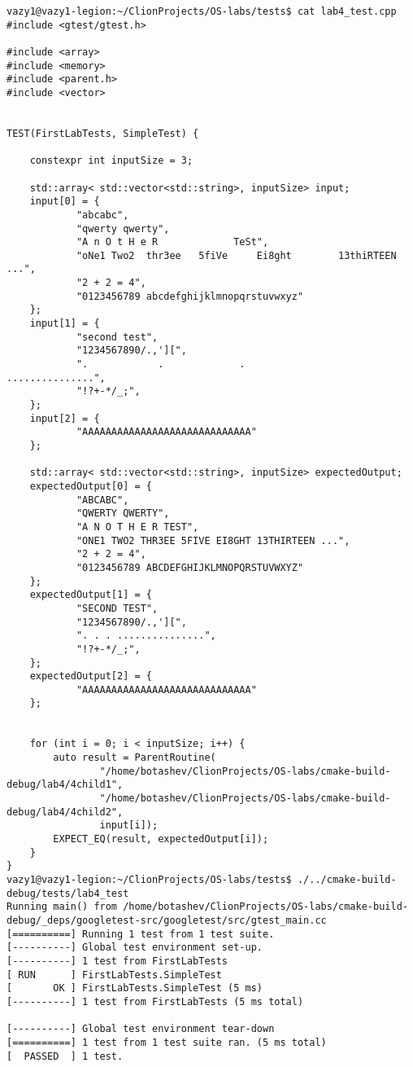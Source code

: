 \documentclass[pdf, unicode, 12pt, a4paper,oneside,fleqn]{article}
\begin{document}
\begin{verbatim}
vazy1@vazy1-legion:~/ClionProjects/OS-labs/tests$ cat lab4_test.cpp 
#include <gtest/gtest.h>

#include <array>
#include <memory>
#include <parent.h>
#include <vector>


TEST(FirstLabTests, SimpleTest) {

    constexpr int inputSize = 3;

    std::array< std::vector<std::string>, inputSize> input;
    input[0] = {
            "abcabc",
            "qwerty qwerty",
            "A n O t H e R             TeSt",
            "oNe1 Two2  thr3ee   5fiVe     Ei8ght        13thiRTEEN             ...",
            "2 + 2 = 4",
            "0123456789 abcdefghijklmnopqrstuvwxyz"
    };
    input[1] = {
            "second test",
            "1234567890/.,'][",
            ".            .             .                         ...............",
            "!?+-*/_;",
    };
    input[2] = {
            "AAAAAAAAAAAAAAAAAAAAAAAAAAAAA"
    };

    std::array< std::vector<std::string>, inputSize> expectedOutput;
    expectedOutput[0] = {
            "ABCABC",
            "QWERTY QWERTY",
            "A N O T H E R TEST",
            "ONE1 TWO2 THR3EE 5FIVE EI8GHT 13THIRTEEN ...",
            "2 + 2 = 4",
            "0123456789 ABCDEFGHIJKLMNOPQRSTUVWXYZ"
    };
    expectedOutput[1] = {
            "SECOND TEST",
            "1234567890/.,'][",
            ". . . ...............",
            "!?+-*/_;",
    };
    expectedOutput[2] = {
            "AAAAAAAAAAAAAAAAAAAAAAAAAAAAA"
    };


    for (int i = 0; i < inputSize; i++) {
        auto result = ParentRoutine(
                "/home/botashev/ClionProjects/OS-labs/cmake-build-debug/lab4/4child1",
                "/home/botashev/ClionProjects/OS-labs/cmake-build-debug/lab4/4child2",
                input[i]);
        EXPECT_EQ(result, expectedOutput[i]);
    }
}
vazy1@vazy1-legion:~/ClionProjects/OS-labs/tests$ ./../cmake-build-debug/tests/lab4_test 
Running main() from /home/botashev/ClionProjects/OS-labs/cmake-build-debug/_deps/googletest-src/googletest/src/gtest_main.cc
[==========] Running 1 test from 1 test suite.
[----------] Global test environment set-up.
[----------] 1 test from FirstLabTests
[ RUN      ] FirstLabTests.SimpleTest
[       OK ] FirstLabTests.SimpleTest (5 ms)
[----------] 1 test from FirstLabTests (5 ms total)

[----------] Global test environment tear-down
[==========] 1 test from 1 test suite ran. (5 ms total)
[  PASSED  ] 1 test.
\end{verbatim}
\end{document}
